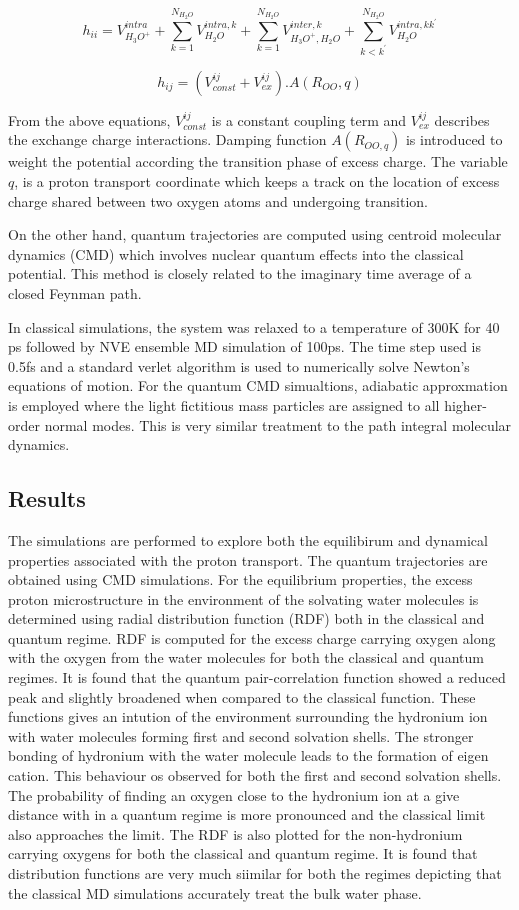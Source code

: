 \documentclass{article}
\begin{document}
$$h_{ii} = V_{H_{3}O^{+}}^{intra} + \sum_{k=1}^{N_{H_{2}O}} V_{H_{2}O}^{intra, k} + \sum_{k=1}^{N_{H_{2}O}} V_{H_{3}O^{+}, H_{2}O}^{inter, k} + \sum_{k<k^{'}}^{N_{H_{2}O}} V_{H_{2}O}^{intra, kk^{'}} $$

$$h_{ij} = (V_{const}^{ij} + V_{ex}^{ij}). A(R_{OO},q) $$

From the above equations, $V_{const}^{ij}$ is a constant coupling term and $V_{ex}^{ij}$ describes the exchange charge interactions. Damping function $A(R_{OO,q})$ is introduced to weight the potential according the transition phase of excess charge. The variable $q$, is a proton transport coordinate which keeps a track on the location of excess charge shared between two oxygen atoms and undergoing transition. 

On the other hand, quantum trajectories are computed using centroid molecular dynamics (CMD) which involves nuclear quantum effects into the classical potential. This method is closely related to the imaginary time average of a closed Feynman path.

In classical simulations, the system was relaxed to a temperature of 300K for 40 ps followed by NVE ensemble MD simulation of 100ps. The time step used is 0.5fs and a standard verlet algorithm is used to numerically solve Newton's equations of motion. For the quantum CMD simualtions, adiabatic approxmation is employed where the light fictitious mass particles are assigned to all higher-order normal modes. This is very similar treatment to the path integral molecular dynamics.

\subsection{Results}
\label{sec-2-3}
The simulations are performed to explore both the equilibirum and dynamical properties associated with the proton transport. The quantum trajectories are obtained using CMD simulations. For the equilibrium properties, the excess proton microstructure in the environment of the solvating water molecules is determined using radial distribution function (RDF) both in the classical and quantum regime. RDF is computed for the excess charge carrying oxygen along with the oxygen from the water molecules for both the classical and quantum regimes. It is found that the quantum pair-correlation function showed a reduced peak and slightly broadened when compared to the classical function. These functions gives an intution of the environment surrounding the hydronium ion with water molecules forming first and second solvation shells. The stronger bonding of hydronium with the water molecule leads to the formation of eigen cation. This behaviour os observed for both the first and second solvation shells. The probability of finding an oxygen close to the hydronium ion at a give distance with in a quantum regime is more pronounced and the classical limit also approaches the limit. The RDF is also plotted for the non-hydronium carrying oxygens for both the classical and quantum regime. It is found that distribution functions are very much siimilar for both the regimes depicting that the classical MD simulations accurately treat the bulk water phase.
\end{document}
